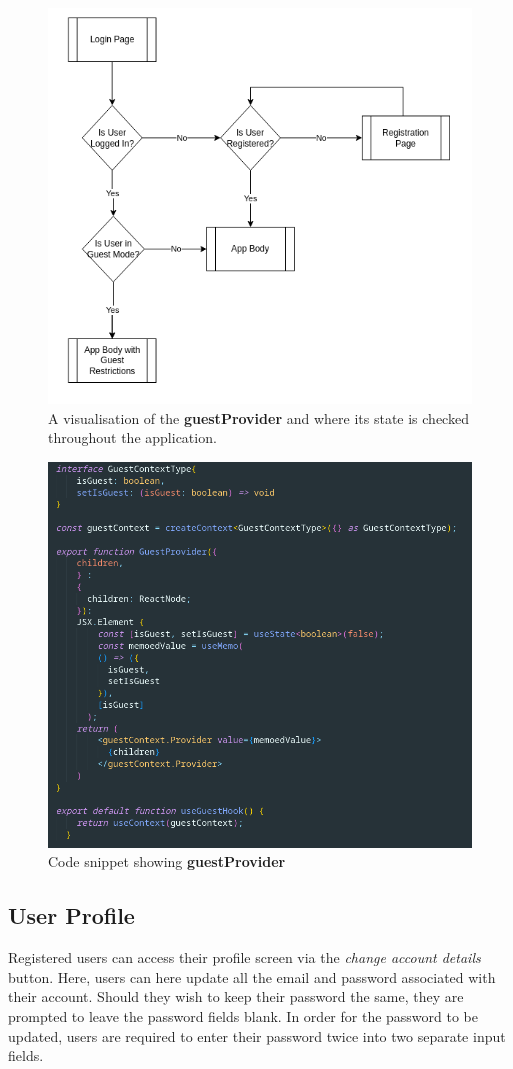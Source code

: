 \documentclass{l4proj}
\begin{document}
\begin{figure}[ht]
    \centering
    \includegraphics[width=0.6\linewidth]{images/loginFlow.pdf}    

    \caption{A visualisation of the \textbf{guestProvider} and where its state is checked throughout the application.
    }

    \label{fig:flow} 
\end{figure}

\begin{figure}[ht]
    \centering
    \includegraphics[width=0.6\linewidth]{images/guestProvider.pdf}    

    \caption{Code snippet showing \textbf{guestProvider}}

    \label{fig:guestProvider} 
\end{figure}

\subsection{User Profile}
Registered users can access their profile screen via the \textit{change account details} button. Here, users can here update all the email and password associated with their account. Should they wish to keep their password the same,  they are prompted to leave the password fields blank. In order for the password to be updated, users are required to enter their password twice into two separate input fields.
\end{document}
